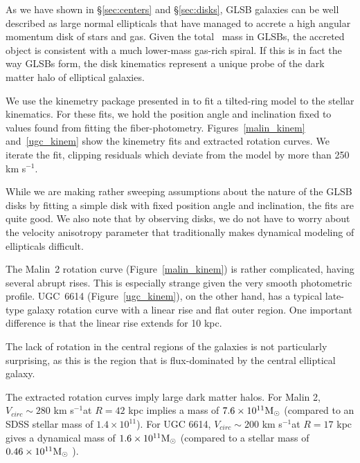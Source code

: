 \documentclass{emulateapj}
\newcommand\msun{\rm{M}_\odot}
\newcommand\kms{km s$^{-1}$}
\newcommand\HI{\ion{H}{1}}
\begin{document}

As we have shown in \S\ref{sec:centers} and \S\ref{sec:disks}, GLSB galaxies can be well described as large normal ellipticals that have managed to accrete a high angular momentum disk of stars and gas.  Given the total \HI\ mass in GLSBs, the accreted object is consistent with a much lower-mass gas-rich spiral.  If this is in fact the way GLSBs form, the disk kinematics represent a unique probe of the dark matter halo of elliptical galaxies.

We use the kinemetry package presented in \citet{Krajn06} to fit a tilted-ring model to the stellar kinematics.  For these fits, we hold the position angle and inclination fixed to values found from fitting the fiber-photometry.  Figures~\ref{malin_kinem} and~\ref{ugc_kinem} show the kinemetry fits and extracted rotation curves.  We iterate the fit, clipping residuals which deviate from the model by more than 250 \kms.  

While we are making rather sweeping assumptions about the nature of the GLSB disks by fitting a simple disk with fixed position angle and inclination, the fits are quite good.  We also note that by observing disks, we do not have to worry about the velocity anisotropy parameter that traditionally makes dynamical modeling of ellipticals difficult.

The Malin~2 rotation curve (Figure~\ref{malin_kinem}) is rather complicated, having several abrupt rises.  This is especially strange given the very smooth photometric profile.  UGC~6614 (Figure~\ref{ugc_kinem}), on the other hand, has a typical late-type galaxy rotation curve with a linear rise and flat outer region.  One important difference is that the linear rise extends for 10 kpc.

The lack of rotation in the central regions of the galaxies is not particularly surprising, as this is the region that is flux-dominated by the central elliptical galaxy.  

The extracted rotation curves imply large dark matter halos.  For Malin 2, $V_{circ}\sim 280$ \kms at $R=42$ kpc implies a mass of $7.6\times 10^{11} \msun$ (compared to an SDSS stellar mass of $1.4\times 10^{11}$).  For UGC 6614, $V_{circ}\sim 200$ \kms at $R=17$ kpc gives a dynamical mass of $1.6\times 10^{11} \msun$ (compared to a stellar mass of $0.46\times 10^{11} \msun$ ).  
\end{document}
